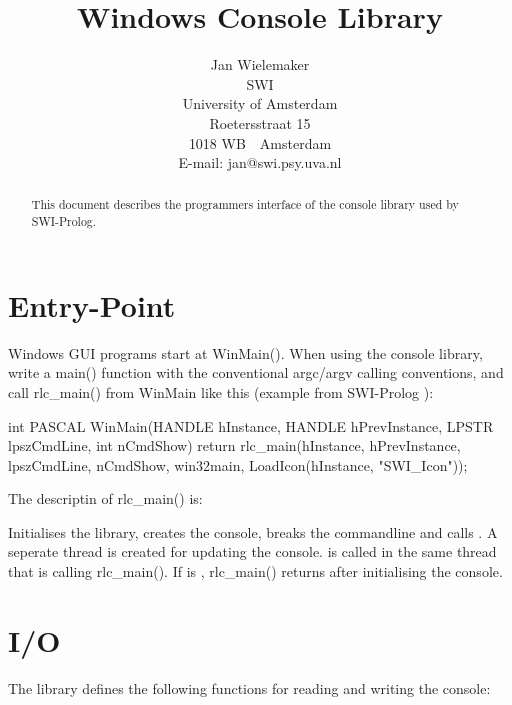 \documentclass[11pt]{article}
\title{Windows Console Library}
\author{Jan Wielemaker \\
	SWI \\
	University of Amsterdam \\
	Roetersstraat 15 \\
	1018 WB~~Amsterdam \\
	E-mail: jan@swi.psy.uva.nl}
\begin{document}
\maketitle

\begin{abstract}
This document describes the programmers interface of the console library
used by SWI-Prolog.
\end{abstract}

\section{Entry-Point}

Windows GUI programs start at WinMain(). When using the console library,
write a main() function with the conventional argc/argv calling
conventions, and call rlc_main() from WinMain like this (example
from SWI-Prolog ):

\begin{code}
int PASCAL
WinMain(HANDLE hInstance, HANDLE hPrevInstance,
	LPSTR lpszCmdLine, int nCmdShow)
{ return rlc_main(hInstance, hPrevInstance, lpszCmdLine, nCmdShow,
		  win32main, LoadIcon(hInstance, "SWI_Icon"));
}
\end{code}

The descriptin of rlc_main() is:

\begin{description}
Initialises the library, creates the console, breaks the commandline
and calls .  A seperate thread is created for updating
the console.   is called in the same thread that is
calling rlc_main().  If  is , rlc_main()
returns after initialising the console.
\end{description}

\section{I/O}

The library defines the following functions for reading and writing the
console:
\end{document}
